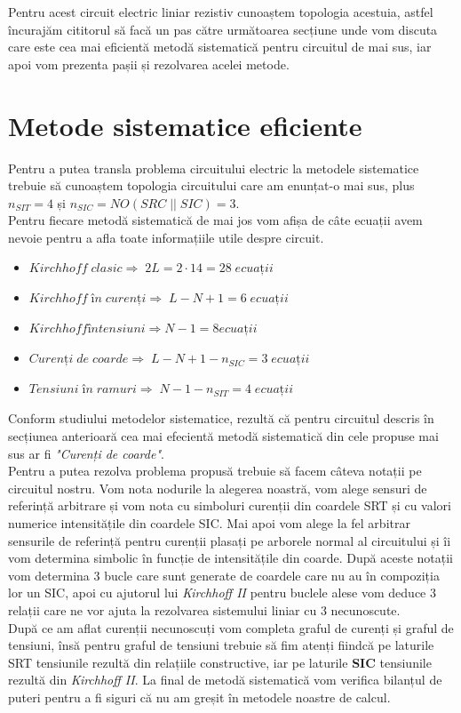 \documentclass[12pt, a4paper]{article}
\begin{document}
\begin{center}
\begin{tikzpicture}[x=0.75pt,y=0.75pt,yscale=-1,xscale=1]
\end{tikzpicture}

\end{center}

Pentru acest circuit electric liniar rezistiv cunoaștem topologia acestuia, astfel încurajăm cititorul să facă un pas către următoarea secțiune unde vom discuta care este cea mai eficientă metodă sistematică pentru circuitul de mai sus, iar apoi vom prezenta pașii și rezolvarea acelei metode.
\newpage

\section{Metode sistematice eficiente}
Pentru a putea transla problema circuitului electric la metodele sistematice trebuie să cunoaștem topologia circuitului care am enunțat-o mai sus, plus $n_{SIT} = 4$ și $n_{SIC} = NO(SRC\;||\;SIC) = 3$.\\
Pentru fiecare metodă sistematică de mai jos vom afișa de câte ecuații avem nevoie pentru a afla toate informațiile utile despre circuit.
\begin{itemize}
    \item $ Kirchhoff \;clasic \Rightarrow \;2L = 2\cdot{}14 = 28 \;ecuații$
    \item $ Kirchhoff \;în \;curenți \Rightarrow \;L - N + 1 = 6 \;ecuații$
    \item $ Kirchhoff  în tensiuni \Rightarrow N - 1 = 8 ecuații$
    \item $ Curenți \;de \;coarde \Rightarrow \;L - N + 1 - n_{SIC}  = 3\;ecuații$
    \item $ Tensiuni \;în \;ramuri \Rightarrow \;N - 1 - n_{SIT} = 4\;ecuații$
\end{itemize}
Conform studiului metodelor sistematice, rezultă că pentru circuitul descris în secțiunea anterioară cea mai efecientă metodă sistematică din cele propuse mai sus ar fi \emph{"Curenți de coarde"}.\\
Pentru a putea rezolva problema propusă trebuie să facem câteva notații pe circuitul nostru. Vom nota nodurile la alegerea noastră, vom alege sensuri de referință arbitrare și vom nota cu simboluri curenții din coardele SRT și cu valori numerice intensitățile din coardele SIC. Mai apoi vom alege la fel arbitrar sensurile de referință pentru curenții plasați pe arborele normal al circuitului și îi vom determina simbolic în funcție de intensitățile din coarde. După aceste notații vom determina 3 bucle care sunt generate de coardele care nu au în compoziția lor un SIC, apoi cu ajutorul lui \emph{Kirchhoff II} pentru buclele alese vom deduce 3 relații care ne vor ajuta la rezolvarea sistemului liniar cu 3 necunoscute.\\
După ce am aflat curenții necunoscuți vom completa graful de curenți și graful de tensiuni, însă pentru graful de tensiuni trebuie să fim atenți fiindcă pe laturile SRT tensiunile rezultă din relațiile constructive, iar pe laturile \textbf{SIC} tensiunile rezultă din \emph{Kirchhoff II}.
La final de metodă sistematică vom verifica bilanțul de puteri pentru a fi siguri că nu am greșit în metodele noastre de calcul.
\newpage
\end{document}
